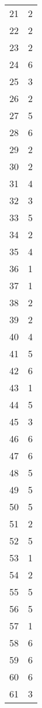 \documentclass[12pt,a4paper]{article}
\begin{document}
\begin{table}[h]
        \begin{tabular}[h]{*{2}{c}}
            21 & 2 \\
            22 & 2 \\
            23 & 2 \\
            24 & 6 \\
            25 & 3 \\
            26 & 2 \\
            27 & 5 \\
            28 & 6 \\
            29 & 2 \\
            30 & 2 \\
            31 & 4 \\
            32 & 3 \\
            33 & 5 \\
            34 & 2 \\
            35 & 4 \\
            36 & 1 \\
            37 & 1 \\
            38 & 2 \\
            39 & 2 \\
            40 & 4 \\
            41 & 5 \\
            42 & 6 \\
            43 & 1 \\
            44 & 5 \\
            45 & 3 \\
            46 & 6 \\
            47 & 6 \\
            48 & 5 \\
            49 & 5 \\
            50 & 5 \\
            51 & 2 \\
            52 & 5 \\
            53 & 1 \\
            54 & 2 \\
            55 & 5 \\
            56 & 5 \\
            57 & 1 \\
            58 & 6 \\
            59 & 6 \\
            60 & 6 \\
            61 & 3 \\

\end{tabular}
\end{table}
\end{document}
